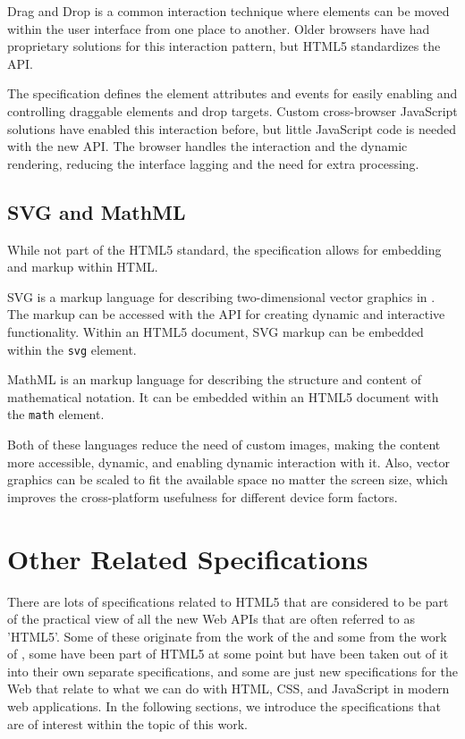 Drag and Drop is a common interaction technique where elements can be
moved within the user interface from one place to another. Older
browsers have had proprietary solutions for this interaction pattern,
but HTML5 standardizes the API.

The specification defines the element attributes and  events
for easily enabling and controlling draggable elements and drop
targets. Custom cross-browser JavaScript solutions have enabled this
interaction before, but little JavaScript code is needed with the new
API. The browser handles the interaction and the dynamic rendering,
reducing the interface lagging and the need for extra processing.

\subsection{SVG and MathML}

While not part of the HTML5 standard, the specification allows for
embedding  \cite{SVGTiny12} and  \cite{MathML}
markup within HTML.

SVG is a markup language for describing two-dimensional vector
graphics in . The markup can be accessed with the 
API for creating dynamic and interactive functionality. Within an
HTML5 document, SVG markup can be embedded within the \texttt{svg}
element.

MathML is an  markup language for describing the structure
and content of mathematical notation. It can be embedded within an
HTML5 document with the \texttt{math} element.

Both of these languages reduce the need of custom images, making the
content more accessible, dynamic, and enabling dynamic interaction
with it. Also, vector graphics can be scaled to fit the available
space no matter the screen size, which improves the cross-platform
usefulness for different device form factors.

\section{Other Related Specifications}

There are lots of specifications related to HTML5 that are considered
to be part of the practical view of all the new Web APIs that are
often referred to as 'HTML5'. Some of these originate from the work of
the  and some from the work of , some have been
part of HTML5 at some point but have been taken out of it into their
own separate specifications, and some are just new specifications for
the Web that relate to what we can do with HTML, CSS, and JavaScript
in modern web applications. In the following sections, we introduce
the specifications that are of interest within the topic of this work.

